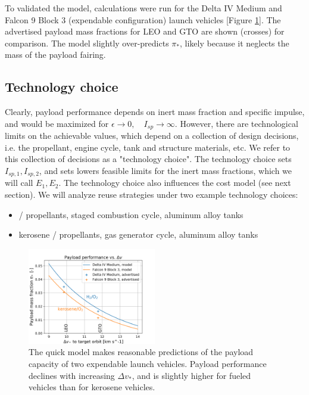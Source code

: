 \documentclass[conf]{new-aiaa}
\begin{document}
\begin{multicols}{2}
To validated the model, calculations were run for the Delta IV Medium and Falcon 9 Block 3 (expendable configuration) launch vehicles [Figure \ref{fig:payload_vs_dv}]. The advertised payload mass fractions for LEO and GTO are shown (crosses) for comparison. The model slightly over-predicts $\pi_*$, likely because it neglects the mass of the payload fairing.

\subsection{Technology choice}
Clearly, payload performance depends on inert mass fraction and specific impulse, and would be maximized for $\epsilon \rightarrow 0, \quad I_{sp} \rightarrow \infty$. However, there are technological limits on the achievable values, which depend on a collection of design decisions, i.e. the propellant, engine cycle, tank and structure materials, etc. We refer to this collection of decisions as a "technology choice". The technology choice sets $I_{sp, 1}, I_{sp, 2}$, and sets lowers feasible limits for the inert mass fractions, which we will call $E_1, E_2$. The technology choice also influences the cost model (see next section). We will analyze reuse strategies under two example technology choices:

\begin{itemize}
    \item {} /  propellants, staged combustion cycle, aluminum alloy tanks
    \item kerosene /  propellants, gas generator cycle, aluminum alloy tanks
\end{itemize}

\begin{figure}[H]
    \centering
    \includegraphics[width=0.5\textwidth]{../../lvreuse/analysis/performance/plots/payload_vs_dv}
    \caption{\label{fig:payload_vs_dv} The quick model makes reasonable predictions of the payload capacity of two expendable launch vehicles. Payload performance declines with increasing $\Delta v_*$, and is slightly higher for  fueled vehicles than for kerosene vehicles.}
\end{figure}


\end{multicols}
\end{document}
